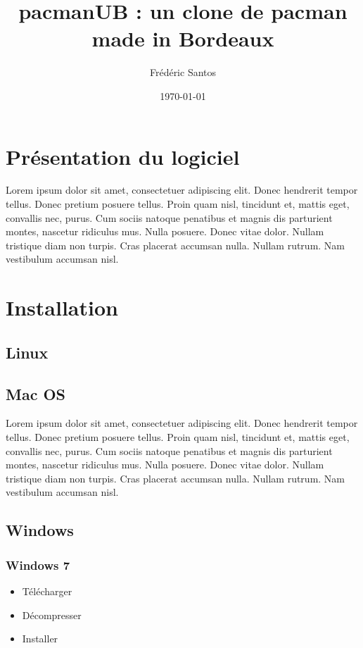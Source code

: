 \documentclass[11pt]{article}
\author{Frédéric Santos}
\date{\today}
\title{pacmanUB : un clone de pacman made in Bordeaux}
\begin{document}
\maketitle
\tableofcontents


\section{Présentation du logiciel}
\label{sec:orgf71e721}
Lorem ipsum dolor sit amet, consectetuer adipiscing elit.  Donec hendrerit tempor tellus.  Donec pretium posuere tellus.  Proin quam nisl, tincidunt et, mattis eget, convallis nec, purus.  Cum sociis natoque penatibus et magnis dis parturient montes, nascetur ridiculus mus.  Nulla posuere.  Donec vitae dolor.  Nullam tristique diam non turpis.  Cras placerat accumsan nulla.  Nullam rutrum.  Nam vestibulum accumsan nisl.

\section{Installation}
\label{sec:org555d520}
\subsection{Linux}
\label{sec:org2088372}
\subsection{Mac OS}
\label{sec:org7c59971}
Lorem ipsum dolor sit amet, consectetuer adipiscing elit.  Donec hendrerit tempor tellus.  Donec pretium posuere tellus.  Proin quam nisl, tincidunt et, mattis eget, convallis nec, purus.  Cum sociis natoque penatibus et magnis dis parturient montes, nascetur ridiculus mus.  Nulla posuere.  Donec vitae dolor.  Nullam tristique diam non turpis.  Cras placerat accumsan nulla.  Nullam rutrum.  Nam vestibulum accumsan nisl.

\subsection{Windows}
\label{sec:org9090ab3}
\subsubsection{Windows 7}
\label{sec:org04bcdcb}
\begin{itemize}
\item Télécharger
\item Décompresser
\item Installer
\end{itemize}
\end{document}
